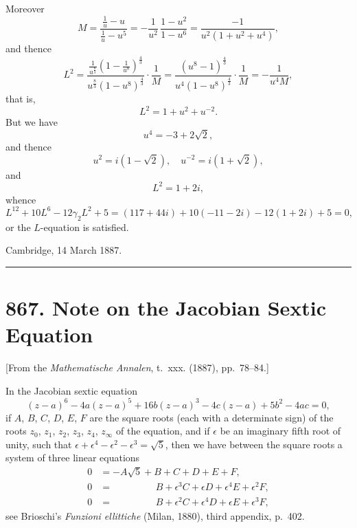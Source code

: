\documentclass[11pt,a4paper]{book}
\begin{document}
Moreover
\[M = \frac{\tfrac{1}{u} - u}{\tfrac{1}{u} - u^5} = -\frac{1}{u^2}\, \frac{1 - u^2}{1 - u^6} = \frac{-1}{u^2(1 + u^2 + u^4)},\]
and thence
\[L^2 = \frac{\tfrac{1}{u^{\frac{8}{3}}}(1 - \tfrac{1}{u^8})^{\frac{4}{3}}}{u^{\frac{8}{3}}(1 - u^8)^{\frac{4}{3}}} \cdot \frac{1}{M} = \frac{(u^8 - 1)^{\frac{4}{3}}}{u^4(1 - u^8)^{\frac{4}{3}}} \cdot \frac{1}{M} = -\frac{1}{u^4M},\]
that is,
\[L^2 = 1 + u^2 + u^{-2}.\]
But we have
\[u^4 = -3 + 2\sqrt{2},\]
and thence
\[u^2 = i(1 - \sqrt{2}), \quad u^{-2} = i(1 + \sqrt{2}),\]
and
\[L^2 = 1 + 2i,\]
whence
\[L^{12} + 10L^6 - 12\gamma_2 L^2 + 5 = (117 + 44i) + 10(-11 - 2i) - 12(1 + 2i) + 5 = 0,\]
or the $L$-equation is satisfied.

\begin{flushright}
Cambridge, 14 March 1887.
\end{flushright}

\vspace{12pt}
\hrule
\vspace{12pt}

\section*{867. Note on the Jacobian Sextic Equation}

\begin{center}
[From the \textit{Mathematische Annalen}, t.~xxx. (1887), pp.~78--84.]
\end{center}

In the Jacobian sextic equation
\[(z - a)^6 - 4a(z - a)^5 + 16b(z - a)^3 - 4c(z - a) + 5b^2 - 4ac = 0,\]
if $A$, $B$, $C$, $D$, $E$, $F$ are the square roots (each with a determinate sign) of the roots $z_0$, $z_1$, $z_2$, $z_3$, $z_4$, $z_\infty$ of the equation, and if $\epsilon$ be an imaginary fifth root of unity, such that $\epsilon + \epsilon^4 - \epsilon^2 - \epsilon^3 = \sqrt{5}$, then we have between the square roots a system of three linear equations
\begin{align*}
0 &= -A\sqrt{5} + B + C + D + E + F, \\
0 &= \phantom{-A\sqrt{5} +}\, B + \epsilon^3 C + \epsilon D + \epsilon^4 E + \epsilon^2 F, \\
0 &= \phantom{-A\sqrt{5} +}\, B + \epsilon^2 C + \epsilon^4 D + \epsilon E + \epsilon^3 F,
\end{align*}
see Brioschi's \textit{Funzioni ellittiche} (Milan, 1880), third appendix, p.~402.
\end{document}
